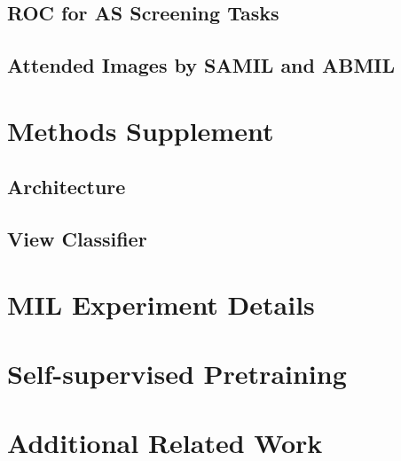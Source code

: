 \documentclass[pmlr]{jmlr}%
\begin{document}
\subsection{ROC for AS Screening Tasks}


\subsection{Attended Images by SAMIL and ABMIL}


\section{Methods Supplement}
\subsection{Architecture}
\label{app:Architecture}


\subsection{View Classifier}
\label{app:ViewClassifier}


\section{MIL Experiment Details}


\section{Self-supervised Pretraining}
\label{app:SSL_Pretraining}


\section{Additional Related Work}
\label{app:relatedworks}

\end{document}

